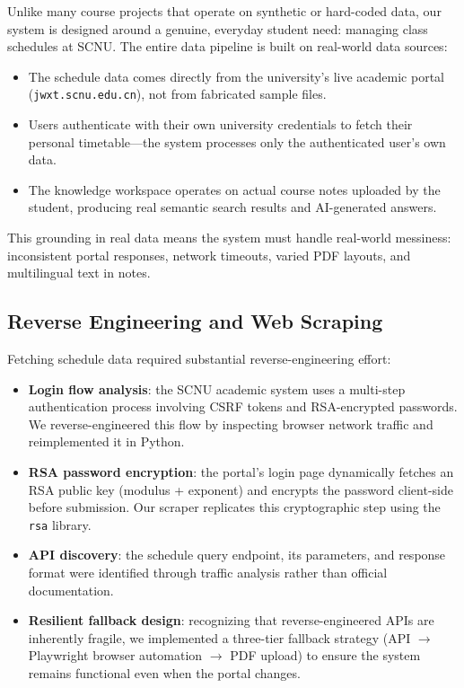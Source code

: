 \documentclass[12pt,a4paper]{article}
\begin{document}
Unlike many course projects that operate on synthetic or hard-coded data, our system is designed around a genuine, everyday student need: managing class schedules at SCNU. The entire data pipeline is built on real-world data sources:

\begin{itemize}[nosep]
    \item The schedule data comes directly from the university's live academic portal (\texttt{jwxt.scnu.edu.cn}), not from fabricated sample files.
    \item Users authenticate with their own university credentials to fetch their personal timetable---the system processes only the authenticated user's own data.
    \item The knowledge workspace operates on actual course notes uploaded by the student, producing real semantic search results and AI-generated answers.
\end{itemize}

This grounding in real data means the system must handle real-world messiness: inconsistent portal responses, network timeouts, varied PDF layouts, and multilingual text in notes.

\subsection{Reverse Engineering and Web Scraping}

Fetching schedule data required substantial reverse-engineering effort:

\begin{itemize}[nosep]
    \item \textbf{Login flow analysis}: the SCNU academic system uses a multi-step authentication process involving CSRF tokens and RSA-encrypted passwords. We reverse-engineered this flow by inspecting browser network traffic and reimplemented it in Python.
    \item \textbf{RSA password encryption}: the portal's login page dynamically fetches an RSA public key (modulus + exponent) and encrypts the password client-side before submission. Our scraper replicates this cryptographic step using the \texttt{rsa} library.
    \item \textbf{API discovery}: the schedule query endpoint, its parameters, and response format were identified through traffic analysis rather than official documentation.
    \item \textbf{Resilient fallback design}: recognizing that reverse-engineered APIs are inherently fragile, we implemented a three-tier fallback strategy (API $\to$ Playwright browser automation $\to$ PDF upload) to ensure the system remains functional even when the portal changes.
\end{itemize}
\end{document}
